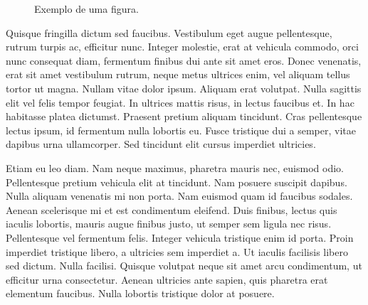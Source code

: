 \begin{figure}
	\begin{center}
	\end{center}
	\caption{Exemplo de uma figura.}
\end{figure}

Quisque fringilla dictum  sed faucibus. Vestibulum eget augue pellentesque, rutrum turpis ac, efficitur nunc. Integer molestie, erat at vehicula commodo, orci nunc consequat diam, fermentum finibus dui ante sit amet eros. Donec venenatis, erat sit amet vestibulum rutrum, neque metus ultrices enim, vel aliquam tellus tortor ut magna. Nullam vitae dolor ipsum. Aliquam erat volutpat. Nulla sagittis elit vel felis tempor feugiat. In ultrices mattis risus, in  lectus faucibus et. In hac habitasse platea dictumst. Praesent pretium aliquam tincidunt. Cras pellentesque lectus ipsum, id fermentum nulla lobortis eu. Fusce tristique dui a  semper, vitae dapibus urna ullamcorper. Sed tincidunt elit cursus imperdiet ultricies.

Etiam eu leo diam. Nam  neque maximus, pharetra mauris nec, euismod odio. Pellentesque pretium vehicula elit at tincidunt. Nam posuere suscipit dapibus. Nulla aliquam venenatis mi non porta. Nam euismod quam id faucibus sodales. Aenean scelerisque mi et est condimentum eleifend. Duis finibus, lectus quis iaculis lobortis, mauris augue finibus justo, ut semper sem ligula nec risus. Pellentesque vel fermentum felis. Integer vehicula tristique enim id porta. Proin imperdiet tristique libero, a ultricies sem imperdiet a. Ut iaculis facilisis libero sed dictum. Nulla facilisi. Quisque volutpat neque sit amet arcu condimentum, ut efficitur urna consectetur. Aenean ultricies ante sapien, quis pharetra erat elementum faucibus. Nulla lobortis tristique dolor at posuere.

